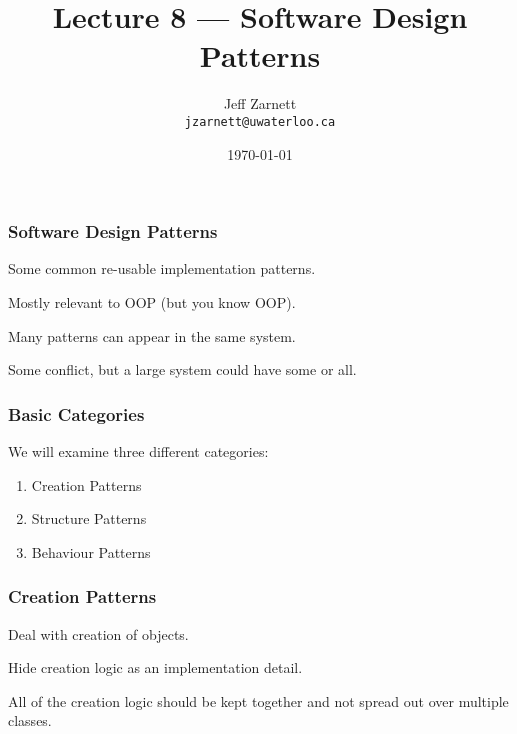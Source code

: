 

\title{Lecture 8 --- Software Design Patterns}

\author{Jeff Zarnett \\ \small \texttt{jzarnett@uwaterloo.ca}}
\date{\today}




\begin{frame}
  \titlepage
\end{frame}

\begin{frame}
\frametitle{Software Design Patterns}

\begin{changemargin}{1cm}
Some common re-usable implementation patterns.

Mostly relevant to OOP (but you know OOP).

Many patterns can appear in the same system.

Some conflict, but a large system could have some or all.

\end{changemargin}
\end{frame}

\begin{frame}
\frametitle{Basic Categories}

\begin{changemargin}{1cm}
We will examine three different categories:

\begin{enumerate}
	\item Creation Patterns
	\item Structure Patterns
	\item Behaviour Patterns
\end{enumerate}
\end{changemargin}
\end{frame}

\begin{frame}
\frametitle{Creation Patterns}

\begin{changemargin}{1cm}
Deal with creation of objects. 

Hide creation logic as an implementation detail.

All of the creation logic should be kept together and not spread out over multiple classes.
\end{changemargin}
\end{frame}


